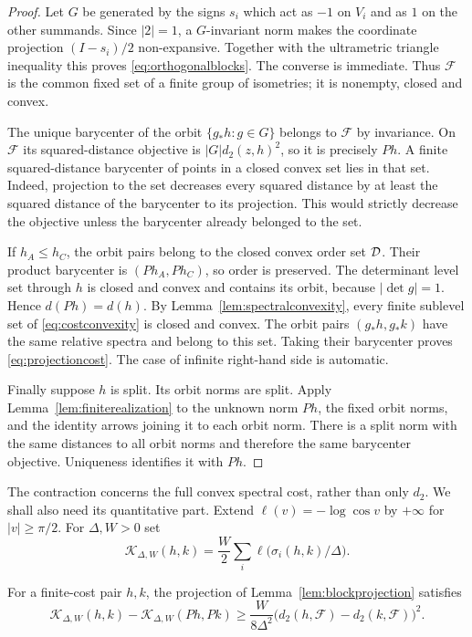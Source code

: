 \begin{proof}
Let $G$ be generated by the signs $s_i$ which act as $-1$ on $V_i$
and as $1$ on the other summands. Since $|2|=1$, a $G$-invariant
norm makes the coordinate projection $(I-s_i)/2$ non-expansive.
Together with the ultrametric triangle inequality this proves
\eqref{eq:orthogonalblocks}. The converse is immediate. Thus
$\mathcal F$ is the common fixed set of a finite group of isometries;
it is nonempty, closed and convex.

The unique barycenter of the orbit $\{g_*h:g\in G\}$ belongs to
$\mathcal F$ by invariance. On $\mathcal F$ its squared-distance
objective is $|G|d_2(z,h)^2$, so it is precisely $Ph$.
A finite squared-distance barycenter of points in a closed convex set
lies in that set. Indeed, projection to the set decreases every squared
distance by at least the squared distance of the barycenter to its
projection. This would strictly decrease the objective unless the
barycenter already belonged to the set.

If $h_A\le h_C$, the orbit pairs belong to the closed convex order
set $\mathcal D$. Their product barycenter is $(Ph_A,Ph_C)$, so order is
preserved. The determinant level set through $h$ is closed and convex
and contains its orbit, because $|\det g|=1$. Hence $d(Ph)=d(h)$.
By Lemma~\ref{lem:spectralconvexity}, every finite sublevel set of
\eqref{eq:costconvexity} is closed and convex. The orbit pairs
$(g_*h,g_*k)$ have the same relative spectra and belong to this set.
Taking their barycenter proves \eqref{eq:projectioncost}. The case of
infinite right-hand side is automatic.

Finally suppose $h$ is split. Its orbit norms are split. Apply
Lemma~\ref{lem:finiterealization} to the unknown norm $Ph$, the fixed
orbit norms, and the identity arrows joining it to each orbit norm.
There is a split norm with the same distances to all orbit norms and
therefore the same barycenter objective. Uniqueness identifies it
with $Ph$.
\end{proof}

The contraction concerns the full convex spectral cost, rather than
only $d_2$. We shall also need its quantitative part. Extend
$\ell(v)=-\log\cos v$ by $+\infty$ for $|v|\ge\pi/2$.
For $\Delta,W>0$ set
\[
 \mathcal K_{\Delta,W}(h,k)
       =\frac W2\sum_i\ell\bigl(\sigma_i(h,k)/\Delta\bigr).
\]

\begin{lemma}\label{lem:projectionloss}
For a finite-cost pair $h,k$, the projection of
Lemma~\ref{lem:blockprojection} satisfies
\begin{equation}\label{eq:projectionloss}
 \mathcal K_{\Delta,W}(h,k)-\mathcal K_{\Delta,W}(Ph,Pk)
 \ge\frac{W}{8\Delta^2}
       \bigl(d_2(h,\mathcal F)-d_2(k,\mathcal F)\bigr)^2.
\end{equation}
\end{lemma}

